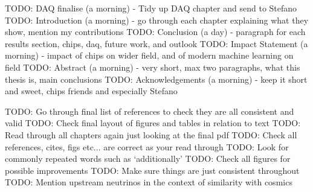 TODO: DAQ finalise (a morning) - Tidy up DAQ chapter and send to Stefano 
TODO: Introduction (a morning) - go through each chapter explaining what they show, mention my contributions
TODO: Conclusion (a day) - paragraph for each results section, chips, daq, future work, and outlook
TODO: Impact Statement (a morning) - impact of chips on wider field, and of modern machine learning on field
TODO: Abstract (a morning) - very short, max two paragraphs, what this thesis is, main conclusions
TODO: Acknowledgements (a morning) - keep it short and sweet, chips friends and especially Stefano

TODO: Go through final list of references to check they are all consistent and valid
TODO: Check final layout of figures and tables in relation to text
TODO: Read through all chapters again just looking at the final pdf
TODO: Check all references, cites, figs etc... are correct as your read through
TODO: Look for commonly repeated words such as `additionally'
TODO: Check all figures for possible improvements
TODO: Make sure things are just consistent throughout
TODO: Mention upstream neutrinos in the context of similarity with cosmics